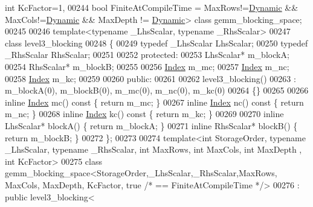 \begin{DoxyCode}
{      int} KcFactor=1,
00244 \textcolor{keywordtype}{bool} FiniteAtCompileTime = MaxRows!=\hyperlink{namespace_eigen_ad81fa7195215a0ce30017dfac309f0b2}{Dynamic} && MaxCols!=\hyperlink{namespace_eigen_ad81fa7195215a0ce30017dfac309f0b2}{Dynamic} && MaxDepth != 
      \hyperlink{namespace_eigen_ad81fa7195215a0ce30017dfac309f0b2}{Dynamic}> \textcolor{keyword}{class }gemm\_blocking\_space;
00245 
00246 \textcolor{keyword}{template}<\textcolor{keyword}{typename} \_LhsScalar, \textcolor{keyword}{typename} \_RhsScalar>
00247 \textcolor{keyword}{class }level3\_blocking
00248 \{
00249     \textcolor{keyword}{typedef} \_LhsScalar LhsScalar;
00250     \textcolor{keyword}{typedef} \_RhsScalar RhsScalar;
00251 
00252   \textcolor{keyword}{protected}:
00253     LhsScalar* m\_blockA;
00254     RhsScalar* m\_blockB;
00255 
00256     \hyperlink{namespace_eigen_a62e77e0933482dafde8fe197d9a2cfde}{Index} m\_mc;
00257     \hyperlink{namespace_eigen_a62e77e0933482dafde8fe197d9a2cfde}{Index} m\_nc;
00258     \hyperlink{namespace_eigen_a62e77e0933482dafde8fe197d9a2cfde}{Index} m\_kc;
00259 
00260   \textcolor{keyword}{public}:
00261 
00262     level3\_blocking()
00263       : m\_blockA(0), m\_blockB(0), m\_mc(0), m\_nc(0), m\_kc(0)
00264     \{\}
00265 
00266     \textcolor{keyword}{inline} \hyperlink{namespace_eigen_a62e77e0933482dafde8fe197d9a2cfde}{Index} mc()\textcolor{keyword}{ const }\{ \textcolor{keywordflow}{return} m\_mc; \}
00267     \textcolor{keyword}{inline} \hyperlink{namespace_eigen_a62e77e0933482dafde8fe197d9a2cfde}{Index} nc()\textcolor{keyword}{ const }\{ \textcolor{keywordflow}{return} m\_nc; \}
00268     \textcolor{keyword}{inline} \hyperlink{namespace_eigen_a62e77e0933482dafde8fe197d9a2cfde}{Index} kc()\textcolor{keyword}{ const }\{ \textcolor{keywordflow}{return} m\_kc; \}
00269 
00270     \textcolor{keyword}{inline} LhsScalar* blockA() \{ \textcolor{keywordflow}{return} m\_blockA; \}
00271     \textcolor{keyword}{inline} RhsScalar* blockB() \{ \textcolor{keywordflow}{return} m\_blockB; \}
00272 \};
00273 
00274 \textcolor{keyword}{template}<\textcolor{keywordtype}{int} StorageOrder, \textcolor{keyword}{typename} \_LhsScalar, \textcolor{keyword}{typename} \_RhsScalar, \textcolor{keywordtype}{int} MaxRows, \textcolor{keywordtype}{int} MaxCols, \textcolor{keywordtype}{int} MaxDepth
      , \textcolor{keywordtype}{int} KcFactor>
00275 \textcolor{keyword}{class }gemm\_blocking\_space<StorageOrder,\_LhsScalar,\_RhsScalar,MaxRows, MaxCols, MaxDepth, KcFactor, true \textcolor{comment}{/*
       == FiniteAtCompileTime */}>
00276   : \textcolor{keyword}{public} level3\_blocking<

\end{DoxyCode}
